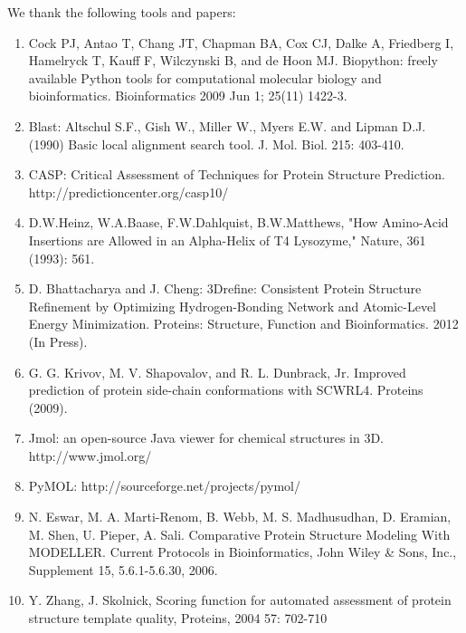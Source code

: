 \documentclass{article}
\begin{document}
We thank the following tools and papers: \\

\begin{enumerate}

\item Cock PJ, Antao T, Chang JT, Chapman BA, Cox CJ, Dalke A, Friedberg I, Hamelryck T, Kauff F, Wilczynski B, and de Hoon MJ. Biopython: freely available Python tools for computational molecular biology and bioinformatics. Bioinformatics 2009 Jun 1; 25(11) 1422-3.

\item Blast:  Altschul S.F., Gish W., Miller W., Myers E.W. and Lipman D.J. (1990)
Basic local alignment search tool.  J. Mol. Biol. 215: 403-410.

\item CASP: Critical Assessment of Techniques for Protein Structure Prediction. http://predictioncenter.org/casp10/

\item D.W.Heinz, W.A.Baase, F.W.Dahlquist, B.W.Matthews, "How Amino-Acid Insertions are Allowed in an Alpha-Helix of T4 Lysozyme," Nature, 361 (1993): 561.

\item D. Bhattacharya and J. Cheng: 3Drefine: Consistent Protein Structure Refinement by Optimizing Hydrogen-Bonding Network and Atomic-Level Energy Minimization.
Proteins: Structure, Function and Bioinformatics. 2012 (In Press).

\item G. G. Krivov, M. V. Shapovalov, and R. L. Dunbrack, Jr. Improved prediction of protein side-chain conformations with SCWRL4. Proteins (2009).

\item Jmol: an open-source Java viewer for chemical structures in 3D. http://www.jmol.org/ 

\item PyMOL: http://sourceforge.net/projects/pymol/

\item N. Eswar, M. A. Marti-Renom, B. Webb, M. S. Madhusudhan, D. Eramian, M. Shen, U. Pieper, A. Sali. Comparative Protein Structure Modeling With MODELLER. Current Protocols in Bioinformatics, John Wiley \& Sons, Inc., Supplement 15, 5.6.1-5.6.30, 2006.

\item Y. Zhang, J. Skolnick, Scoring function for automated assessment of protein structure template quality, Proteins, 2004 57: 702-710


\end{enumerate}
\end{document}
